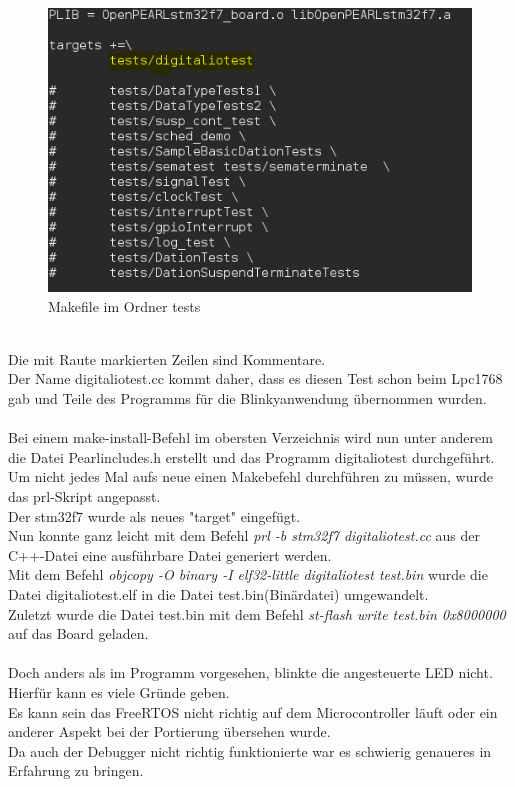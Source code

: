 \begin{figure}[h]
\begin{center}
\includegraphics[width=12cm]{grafiken/Makefile_tests.png}
\caption{Makefile im Ordner tests}
\label{Makefile_tests}
\end{center}
\end{figure}
\\
Die mit Raute markierten Zeilen sind Kommentare.\\
Der Name digitaliotest.cc kommt daher, dass es diesen Test schon beim Lpc1768 gab und Teile des Programms für die Blinkyanwendung übernommen wurden.\\
\\
Bei einem make-install-Befehl im obersten Verzeichnis wird nun unter anderem die Datei Pearlincludes.h erstellt und das Programm digitaliotest durchgeführt.\\
Um nicht jedes Mal aufs neue einen Makebefehl durchführen zu müssen, wurde das prl-Skript angepasst.\\ 
Der stm32f7 wurde als neues "target" eingefügt.\\
Nun konnte ganz leicht mit dem Befehl {\textit{prl -b stm32f7 digitaliotest.cc}} aus der C++-Datei eine ausführbare Datei generiert werden.\\
Mit dem Befehl {\textit{objcopy -O binary -I elf32-little digitaliotest test.bin}} wurde die Datei digitaliotest.elf in die Datei test.bin(Binärdatei) umgewandelt.\\
Zuletzt wurde die Datei test.bin mit dem Befehl {\textit{st-flash write test.bin 0x8000000}} auf das Board geladen.\\
\\
Doch anders als im Programm vorgesehen, blinkte die angesteuerte LED nicht.\\
Hierfür kann es viele Gründe geben.\\
Es kann sein das FreeRTOS nicht richtig auf dem Microcontroller läuft oder ein anderer Aspekt bei der Portierung übersehen wurde.\\
Da auch der Debugger nicht richtig funktionierte war es schwierig genaueres in Erfahrung zu bringen.\\

